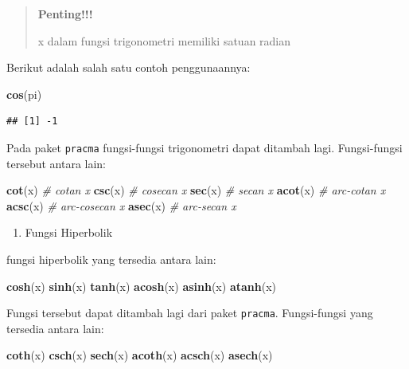 \documentclass[]{book}
\newenvironment{Shaded}{\begin{snugshade}}{\end{snugshade}}
\newcommand{\CommentTok}[1]{\textcolor[rgb]{0.56,0.35,0.01}{\textit{#1}}}
\newcommand{\KeywordTok}[1]{\textcolor[rgb]{0.13,0.29,0.53}{\textbf{#1}}}
\newcommand{\NormalTok}[1]{#1}
\providecommand{\tightlist}{%
  \setlength{\itemsep}{0pt}\setlength{\parskip}{0pt}}
\theoremstyle{definition}
\theoremstyle{definition}
\theoremstyle{definition}
\theoremstyle{remark}
\begin{document}
\begin{quote}
\textbf{Penting!!!}

x dalam fungsi trigonometri memiliki satuan radian
\end{quote}

Berikut adalah salah satu contoh penggunaannya:

\begin{Shaded}
\begin{Highlighting}[]
\KeywordTok{cos}\NormalTok{(pi)}
\end{Highlighting}
\end{Shaded}

\begin{verbatim}
## [1] -1
\end{verbatim}

Pada paket \texttt{pracma} fungsi-fungsi trigonometri dapat ditambah lagi. Fungsi-fungsi tersebut antara lain:

\begin{Shaded}
\begin{Highlighting}[]
\KeywordTok{cot}\NormalTok{(x) }\CommentTok{# cotan x}
\KeywordTok{csc}\NormalTok{(x) }\CommentTok{# cosecan x}
\KeywordTok{sec}\NormalTok{(x) }\CommentTok{# secan x}
\KeywordTok{acot}\NormalTok{(x) }\CommentTok{# arc-cotan x}
\KeywordTok{acsc}\NormalTok{(x) }\CommentTok{# arc-cosecan x}
\KeywordTok{asec}\NormalTok{(x) }\CommentTok{# arc-secan x}
\end{Highlighting}
\end{Shaded}

\begin{enumerate}
\def\labelenumi{\arabic{enumi}.}
\setcounter{enumi}{2}
\tightlist
\item
  Fungsi Hiperbolik
\end{enumerate}

fungsi hiperbolik yang tersedia antara lain:

\begin{Shaded}
\begin{Highlighting}[]
\KeywordTok{cosh}\NormalTok{(x) }
\KeywordTok{sinh}\NormalTok{(x)}
\KeywordTok{tanh}\NormalTok{(x)}
\KeywordTok{acosh}\NormalTok{(x)}
\KeywordTok{asinh}\NormalTok{(x)}
\KeywordTok{atanh}\NormalTok{(x)}
\end{Highlighting}
\end{Shaded}

Fungsi tersebut dapat ditambah lagi dari paket \texttt{pracma}. Fungsi-fungsi yang tersedia antara lain:

\begin{Shaded}
\begin{Highlighting}[]
\KeywordTok{coth}\NormalTok{(x)}
\KeywordTok{csch}\NormalTok{(x)}
\KeywordTok{sech}\NormalTok{(x)}
\KeywordTok{acoth}\NormalTok{(x)}
\KeywordTok{acsch}\NormalTok{(x)}
\KeywordTok{asech}\NormalTok{(x)}
\end{Highlighting}
\end{Shaded}
\end{document}

